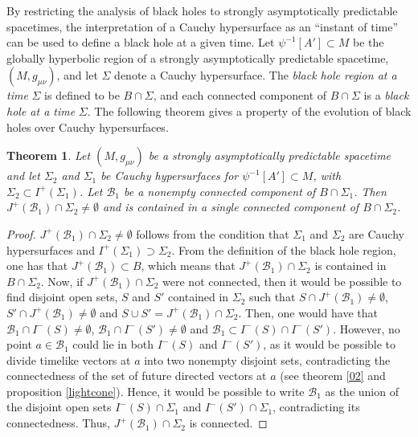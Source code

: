 \documentclass[
12pt,		%
openright,	%
twoside,  %
a4paper,			%
chapter=TITLE,		%
english,			%
french,				%
spanish,			%
brazil				%
]{USPSC-classe/USPSC}
\newtheorem{theorem}{Theorem}[section]
\begin{document}
By restricting the analysis of black holes to strongly asymptotically predictable spacetimes, the interpretation of a Cauchy hypersurface as an “instant of time” can be used to define a black hole at a given time. Let $\psi^{-1}[A']\subset M$ be the globally hyperbolic region of a strongly asymptotically predictable spacetime, $(M,g_{\mu\nu})$, and let $\Sigma$ denote a Cauchy hypersurface. The \textit{black hole region at a time} $\Sigma$ is defined to be $B\cap\Sigma$, and each connected component of $B\cap\Sigma$ is a \textit{black hole at a time} $\Sigma$. The following theorem gives a property of the evolution of black holes over Cauchy hypersurfaces.

\begin{theorem}\label{45678}
    Let $(M,g_{\mu\nu})$ be a strongly asymptotically predictable spacetime and let $\Sigma_2$ and $\Sigma_1$ be Cauchy hypersurfaces for $\psi^{-1}[A']\subset M$, with $\Sigma_2\subset I^+(\Sigma_1)$. Let $\mathscr{B}_1$ be a nonempty connected component of $B\cap\Sigma_1$. Then $J^+(\mathscr{B}_1)\cap \Sigma_2\neq \emptyset$ and is contained in a single connected component of $B\cap\Sigma_2$.
\end{theorem}
\begin{proof}
$J^+(\mathscr{B}_1)\cap \Sigma_2\neq \emptyset$ follows from the condition that $\Sigma_1$ and $\Sigma_2$ are Cauchy hypersurfaces and $I^+(\Sigma_1)\supset\Sigma_2$. From the definition of the black hole region, one has that $J^+(\mathscr{B}_1)\subset B$, which means that $J^+(\mathscr{B}_1)\cap \Sigma_2$ is contained in $B\cap\Sigma_2$. Now, if $J^+(\mathscr{B}_1)\cap \Sigma_2$ were not connected, then it would be possible to find disjoint open sets, $S$ and $S'$ contained in $\Sigma_2$ such that $S\cap J^+(\mathscr{B}_1)\neq\emptyset$, $S'\cap J^+(\mathscr{B}_1)\neq\emptyset$ and $S\cup S'= J^+(\mathscr{B}_1)\cap \Sigma_2$. Then, one would have that $\mathscr{B}_1\cap I^-(S)\neq\emptyset$, $\mathscr{B}_1\cap I^-(S')\neq\emptyset$ and $\mathscr{B}_1\subset I^-(S)\cap I^-(S')$. However, no point $a\in\mathscr{B}_1$ could lie in both $I^-(S)$ and $I^-(S')$, as it would be possible to divide timelike vectors at $a$ into two nonempty disjoint sets, contradicting the connectedness of the set of future directed vectors at $a$ (see theorem \ref{02} and proposition \ref{lightcone}). Hence, it would be possible to write $\mathscr{B}_1$ as the union of the disjoint open sets $I^-(S)\cap\Sigma_1$ and $I^-(S')\cap\Sigma_1$, contradicting its connectedness. Thus, $J^+(\mathscr{B}_1)\cap \Sigma_2$ is connected.
\end{proof}
\end{document}
